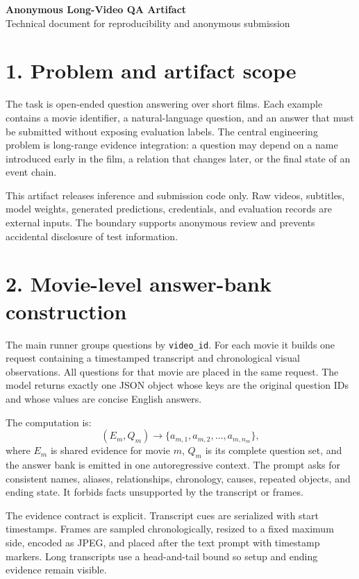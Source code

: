 \documentclass[10pt]{article}
\begin{document}
\begin{center}
{\Large\bfseries Anonymous Long-Video QA Artifact}\\[3pt]
{\small Technical document for reproducibility and anonymous submission}
\end{center}

\section*{1. Problem and artifact scope}

The task is open-ended question answering over short films. Each example
contains a movie identifier, a natural-language question, and an answer that
must be submitted without exposing evaluation labels. The central engineering
problem is long-range evidence integration: a question may depend on a name
introduced early in the film, a relation that changes later, or the final state
of an event chain.

This artifact releases inference and submission code only. Raw videos,
subtitles, model weights, generated predictions, credentials, and evaluation
records are external inputs. The boundary supports anonymous review and
prevents accidental disclosure of test information.

\section*{2. Movie-level answer-bank construction}

The main runner groups questions by \texttt{video\_id}. For each movie it
builds one request containing a timestamped transcript and chronological visual
observations. All questions for that movie are placed in the same request. The
model returns exactly one JSON object whose keys are the original question IDs
and whose values are concise English answers.

The computation is:
\[
  (E_m,Q_m) \longrightarrow
  \{a_{m,1},a_{m,2},\ldots,a_{m,n_m}\},
\]
where $E_m$ is shared evidence for movie $m$, $Q_m$ is its complete question
set, and the answer bank is emitted in one autoregressive context. The prompt
asks for consistent names, aliases, relationships, chronology, causes,
repeated objects, and ending state. It forbids facts unsupported by the
transcript or frames.

The evidence contract is explicit. Transcript cues are serialized with start
timestamps. Frames are sampled chronologically, resized to a fixed maximum
side, encoded as JPEG, and placed after the text prompt with timestamp markers.
Long transcripts use a head-and-tail bound so setup and ending evidence remain
visible.
\end{document}
